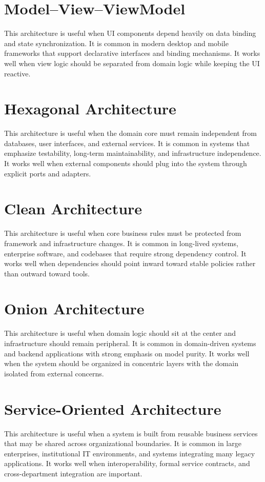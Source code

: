 \documentclass[a4paper]{article}
\begin{document}
    
    \section{Model--View--ViewModel}
        This architecture is useful when UI components depend heavily on data binding and state synchronization.
        It is common in modern desktop and mobile frameworks that support declarative interfaces and binding mechanisms.
        It works well when view logic should be separated from domain logic while keeping the UI reactive.
    
    
    \section{Hexagonal Architecture}
        This architecture is useful when the domain core must remain independent from databases, user interfaces, and external services.
        It is common in systems that emphasize testability, long-term maintainability, and infrastructure independence.
        It works well when external components should plug into the system through explicit ports and adapters.
    
    
    \section{Clean Architecture}
        This architecture is useful when core business rules must be protected from framework and infrastructure changes.
        It is common in long-lived systems, enterprise software, and codebases that require strong dependency control.
        It works well when dependencies should point inward toward stable policies rather than outward toward tools.
    
    
    \section{Onion Architecture}
        This architecture is useful when domain logic should sit at the center and infrastructure should remain peripheral.
        It is common in domain-driven systems and backend applications with strong emphasis on model purity.
        It works well when the system should be organized in concentric layers with the domain isolated from external concerns.
    
    
    \section{Service-Oriented Architecture}
        This architecture is useful when a system is built from reusable business services that may be shared across organizational boundaries.
        It is common in large enterprises, institutional IT environments, and systems integrating many legacy applications.
        It works well when interoperability, formal service contracts, and cross-department integration are important.
    
\end{document}
